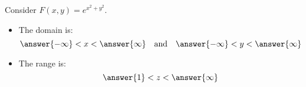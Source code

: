 \documentclass{ximera}
\author{Jim Talamo \and Bart Snapp}
\begin{document}
\begin{exercise}
  Consider $F(x,y) = e^{x^2+y^2}$.
  \begin{itemize}
  \item The domain is:
    \[
    \answer{-\infty} < x < \answer{\infty}\quad\text{and}\quad \answer{-\infty} < y < \answer{\infty}
    \]
  \item The range is:
    \[
     \answer{1} < z < \answer{\infty}
    \]    
  \end{itemize}
\end{exercise}
\end{document}
